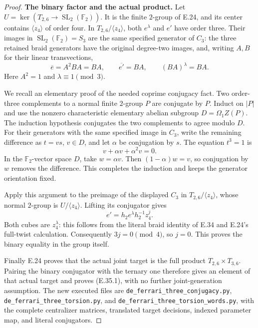 \begin{proof}
\par\medskip\noindent\textbf{The binary factor and the actual product.}\quad
Let $U=\ker(T_{2,6}\to\operatorname{SL}_2(\mathbb F_2))$.
It is the finite $2$-group of E.24, and its center
contains $\langle z_4\rangle$ of order four. In
$T_{2,6}/\langle z_4\rangle$, both $e^\lambda$ and
$e'$ have order three. Their images in
$\operatorname{SL}_2(\mathbb F_2)=S_3$ are the same
specified generator of $C_3$: the three retained
braid generators have the original degree-two images,
and, writing $A,B$ for their linear transvections,
\[
     \overline e=A^2BA=BA,
     \qquad\overline {e'}=BA,
     \qquad(BA)^\lambda=BA.
 \tag{E.35.11}
\]
Here $A^2=1$ and $\lambda\equiv1\pmod3$.

We recall an elementary proof of the needed
coprime conjugacy fact. Two order-three complements
to a normal finite $2$-group $P$ are conjugate by
$P$. Induct on $|P|$ and use the nonzero characteristic
elementary abelian subgroup $D=\Omega_1Z(P)$.
The induction hypothesis conjugates the two
complements to agree modulo $D$. For their generators
with the same specified image in $C_3$, write the
remaining difference as $t=vs$, $v\in D$, and let
$\alpha$ be conjugation by $s$. The equation $t^3=1$
is
\[
             v+\alpha v+\alpha^2v=0.
\]
In the $\mathbb F_2$-vector space $D$, take
$w=\alpha v$. Then
$(1-\alpha)w=v$, so conjugation by $w$ removes
the difference. This completes the induction and
keeps the generator orientation fixed.

Apply this argument to the preimage of the displayed
$C_3$ in $T_{2,6}/\langle z_4\rangle$, whose normal
$2$-group is $U/\langle z_4\rangle$. Lifting its
conjugator gives
\[
              e'=h_2e^\lambda h_2^{-1}z_4^j.
\]
Both cubes are $z_4^\lambda$: this follows from the
literal braid identity of E.34 and E.24's full-twist
calculation. Consequently $3j=0\pmod4$, so $j=0$.
This proves the binary equality in the group itself.

Finally E.24 proves that the actual joint target is
the full product $T_{2,6}\times T_{3,6}$. Pairing the
binary conjugator with the ternary one therefore
gives an element of that actual target and proves
(E.35.1), with no further joint-generation assumption.
The new executed files are
\texttt{de\_ferrari\_three\_conjugacy.py},
\texttt{de\_ferrari\_three\_torsion.py}, and
\texttt{de\_ferrari\_three\_torsion\_words.py},
with the complete centralizer matrices, translated
target decisions, indexed parameter map, and literal
conjugators.
\end{proof}
